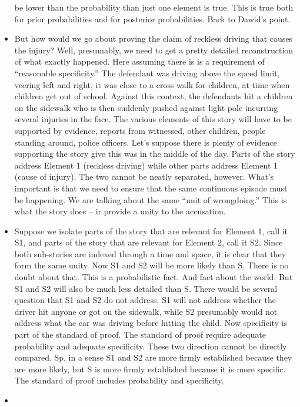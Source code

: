 \documentclass[
  10pt,
  dvipsnames,enabledeprecatedfontcommands]{scrartcl}
\begin{document}
\begin{itemize}
  be lower than the probability than just one element is true. This is
  true both for prior probabilities and for posterior probabilities.
  Back to Dawid's point.
\item
  But how would we go about proving the claim of reckless driving that
  causes the injury? Well, presumably, we need to get a pretty detailed
  reconstruction of what exactly happened. Here assuming there is is a
  requirement of ``reasonable specificity.'' The defendant was driving
  above the speed limit, veering left and right, it was close to a cross
  walk for children, at time when children get out of school. Against
  this context, the defendants hit a children on the sidewalk who is
  then suddenly pushed against light pole incurring several injuries in
  the face. The various elements of this story will have to be supported
  by evidence, reports from witnessed, other children, people standing
  around, police officers. Let's suppose there is plenty of evidence
  supporting the story give this was in the middle of the day. Parts of
  the story address Element 1 (reckless driving) while other parts
  address Element 1 (cause of injury). The two cannot be neatly
  separated, however. What's important is that we need to ensure that
  the same continuous episode must be happening. We are talking about
  the same ``unit of wrongdoing.'' This is what the story does -- ir
  provide a unity to the accusation.
\item
  Suppose we isolate parts of the story that are relevant for Element 1,
  call it S1, and parts of the story that are relevant for Element 2,
  call it S2. Since both sub-stories are indexed through a time and
  space, it is clear that they form the same unity. Now S1 and S2 will
  be more likely than S. There is no doubt about that. This is a
  probabilistic fact. And fact about the world. But S1 and S2 will also
  be much less detailed than S. There would be several question that S1
  and S2 do not address. S1 will not address whether the driver hit
  anyone or got on the sidewalk, while S2 presumably would not address
  what the car was driving before hitting the child. Now specificity is
  part of the standard of proof. The standard of proof require adequate
  probability and adequate specificity. These two direction cannot be
  directly compared. Sp, in a sense S1 and S2 are more firmly
  established because they are more likely, but S is more firmly
  established because it is more specific. The standard of proof
  includes probability and specificity.
\item

\end{itemize}
\end{document}
